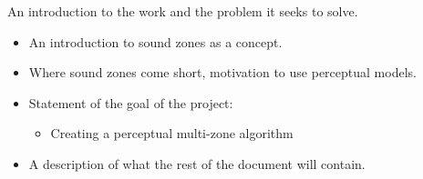 An introduction to the work and the problem it seeks to solve.
\begin{itemize}
    \item An introduction to sound zones as a concept.
    \item Where sound zones come short, motivation to use perceptual models.
    \item Statement of the goal of the project:
        \begin{itemize}
            \item Creating a perceptual multi-zone algorithm
        \end{itemize}
    \item A description of what the rest of the document will contain.
 \end{itemize}
